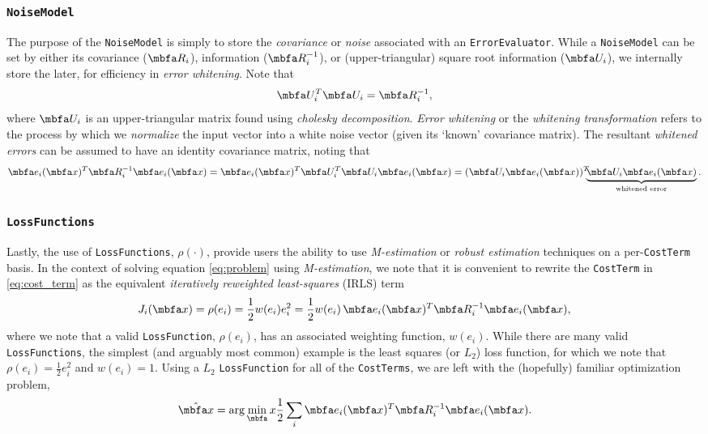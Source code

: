 \documentclass[10pt,letterpaper,fleqn,oneside]{article}
\newcommand{\code}[1]{\texttt{#1}}
\begin{document}
\subsubsection{\code{NoiseModel}}
\label{sec:noise_model}

The purpose of the \code{NoiseModel} is simply to store the \emph{covariance} or \emph{noise} associated with an \code{ErrorEvaluator}. While a \code{NoiseModel} can be set by either its covariance ($\mbf{R}_i$), information ($\mbf{R}_i^{-1}$), or (upper-triangular) square root information ($\mbf{U}_i$), we internally store the later, for efficiency in \emph{error whitening}.
Note that
%
\begin{equation}
\mbf{U}_i^T \mbf{U}_i = \mbf{R}_i^{-1},
\end{equation}
%
where $\mbf{U}_i$ is an upper-triangular matrix found using \emph{cholesky decomposition}.
\emph{Error whitening} or the \emph{whitening transformation} refers to the process by which we \emph{normalize} the input vector into a white noise vector (given its `known' covariance matrix).
The resultant \emph{whitened errors} can be assumed to have an identity covariance matrix, noting that
%
\begin{equation}
\mbf{e}_i(\mbf{x})^T \mbf{R}_i^{-1} \mbf{e}_i(\mbf{x}) = 
 \mbf{e}_i(\mbf{x})^T \mbf{U}_i^T \mbf{U}_i \mbf{e}_i(\mbf{x}) =
(\mbf{U}_i \mbf{e}_i(\mbf{x}))^T \hspace{-5px}\underbrace{\mbf{U}_i \mbf{e}_i(\mbf{x})}_{\text{whitened error}}.
\end{equation}
%

\subsubsection{\code{LossFunctions}}
\label{sec:loss_func}

Lastly, the use of \code{LossFunctions}, $\rho(\cdot)$, provide users the ability to use \emph{M-estimation} or \emph{robust estimation} techniques on a per-\code{CostTerm} basis.
In the context of solving equation \eqref{eq:problem} using \emph{M-estimation}, we note that it is convenient to rewrite the \code{CostTerm} in \eqref{eq:cost_term} as the equivalent \emph{iteratively reweighted least-squares} (IRLS) term
%
\begin{equation}
\label{eq:irls_cost_term}
J_i(\mbf{x}) = \rho(e_i) = \frac{1}{2} w(e_i) e_i^2 = \frac{1}{2} w(e_i) \, \mbf{e}_i(\mbf{x})^T \mbf{R}_i^{-1} \mbf{e}_i(\mbf{x}),
\end{equation}
%
where we note that a valid \code{LossFunction}, $\rho(e_i)$, has an associated weighting function, $w(e_i)$.
While there are many valid \code{LossFunctions}, the simplest (and arguably most common) example is the least squares (or $L_2$) loss function, for which we note that $\rho(e_i) = \frac{1}{2} e_i^2$ and $w(e_i) = 1$.
Using a $L_2$ \code{LossFunction} for all of the \code{CostTerms}, we are left with the (hopefully) familiar optimization problem,
%
\begin{equation}
\mbfhat{x} = \arg\min_\mbf{x} \frac{1}{2} \sum_i \mbf{e}_i(\mbf{x})^T \mbf{R}_i^{-1} \mbf{e}_i(\mbf{x}).
\end{equation}
\end{document}
